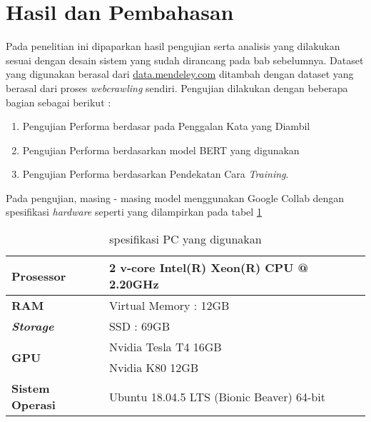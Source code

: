 \section{Hasil dan Pembahasan}
\label{sec:hasilpembahasan}

Pada penelitian ini dipaparkan hasil pengujian serta analisis yang dilakukan sesuai dengan desain sistem yang sudah dirancang pada bab sebelumnya. Dataset yang digunakan berasal dari \url{data.mendeley.com} ditambah dengan dataset yang berasal dari proses \textit{webcrawling} sendiri. Pengujian dilakukan dengan beberapa bagian sebagai berikut :

\begin{enumerate}[nolistsep]
    \item Pengujian Performa berdasar pada Penggalan Kata yang Diambil
    \item Pengujian Performa berdasarkan model BERT yang digunakan
    \item Pengujian Performa berdasarkan Pendekatan Cara \textit{Training}.
\end{enumerate}

Pada pengujian, masing - masing model menggunakan Google Collab dengan spesifikasi \textit{hardware} seperti yang dilampirkan pada tabel \ref{tab:specs_collab}

\begin{table}
    \caption{spesifikasi PC yang digunakan}
    \label{tab:specs_collab}
    \centering
    \begin{tabular}{|l|l|}
        \hline
        \textbf{Prosessor}            & 2 v-core Intel(R) Xeon(R) CPU @ 2.20GHz   \\ \hline
        \textbf{RAM}                  & Virtual Memory : 12GB                     \\ \hline
        \textit{\textbf{Storage}}     & SSD : 69GB                                \\ \hline
        \multirow{2}{*}{\textbf{GPU}} & Nvidia Tesla T4 16GB                      \\ \cline{2-2}
                                      & Nvidia K80 12GB                           \\ \hline
        \textbf{Sistem Operasi}       & Ubuntu 18.04.5 LTS (Bionic Beaver) 64-bit \\ \hline
    \end{tabular}
\end{table}

